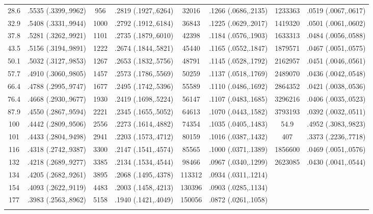 \begin{longtable}{cccccccc}
  28.6 & .5535 (.3399,.9962) & 956 & .2819 (.1927,.6264) & 32016 & .1266 (.0686,.2135) & 1233363 & .0519 (.0067,.0617) \\ 
  32.9 & .5408 (.3331,.9944) & 1000 & .2792 (.1912,.6184) & 36843 & .1225 (.0629,.2017) & 1419320 & .0501 (.0061,.0602) \\ 
  37.8 & .5281 (.3262,.9921) & 1101 & .2735 (.1879,.6010) & 42398 & .1184 (.0576,.1903) & 1633313 & .0484 (.0056,.0588) \\ 
  43.5 & .5156 (.3194,.9891) & 1222 & .2674 (.1844,.5821) & 45440 & .1165 (.0552,.1847) & 1879571 & .0467 (.0051,.0575) \\ 
  50.1 & .5032 (.3127,.9853) & 1267 & .2653 (.1832,.5756) & 48791 & .1145 (.0528,.1792) & 2162957 & .0451 (.0046,.0561) \\ 
  57.7 & .4910 (.3060,.9805) & 1457 & .2573 (.1786,.5569) & 50259 & .1137 (.0518,.1769) & 2489070 & .0436 (.0042,.0548) \\ 
  66.4 & .4788 (.2995,.9747) & 1677 & .2495 (.1742,.5396) & 55589 & .1110 (.0486,.1692) & 2864352 & .0421 (.0038,.0536) \\ 
  76.4 & .4668 (.2930,.9677) & 1930 & .2419 (.1698,.5224) & 56147 & .1107 (.0483,.1685) & 3296216 & .0406 (.0035,.0523) \\ 
  87.9 & .4550 (.2867,.9594) & 2221 & .2345 (.1655,.5052) & 64613 & .1070 (.0443,.1582) & 3793193 & .0392 (.0032,.0511) \\ 
  100 & .4442 (.2809,.9506) & 2556 & .2273 (.1614,.4882) & 74354 & .1035 (.0405,.1483) & 54.9 & .4952 (.3083,.9823) \\ 
  101 & .4433 (.2804,.9498) & 2941 & .2203 (.1573,.4712) & 80159 & .1016 (.0387,.1432) & 407 & .3373 (.2236,.7718) \\ 
  116 & .4318 (.2742,.9387) & 3300 & .2147 (.1541,.4574) & 85565 & .1000 (.0371,.1389) & 1856600 & .0469 (.0051,.0576) \\ 
  132 & .4218 (.2689,.9277) & 3385 & .2134 (.1534,.4544) & 98466 & .0967 (.0340,.1299) & 2623085 & .0430 (.0041,.0544) \\ 
  134 & .4205 (.2682,.9261) & 3895 & .2068 (.1495,.4378) & 113312 & .0934 (.0311,.1214) &  &  \\ 
  154 & .4093 (.2622,.9119) & 4483 & .2003 (.1458,.4213) & 130396 & .0903 (.0285,.1134) &  &  \\ 
  177 & .3983 (.2563,.8962) & 5158 & .1940 (.1421,.4049) & 150056 & .0872 (.0261,.1058) &  &  \\ 
   \hline
\hline
\label{tab marginalized_risks_eq 2}
\end{longtable}
